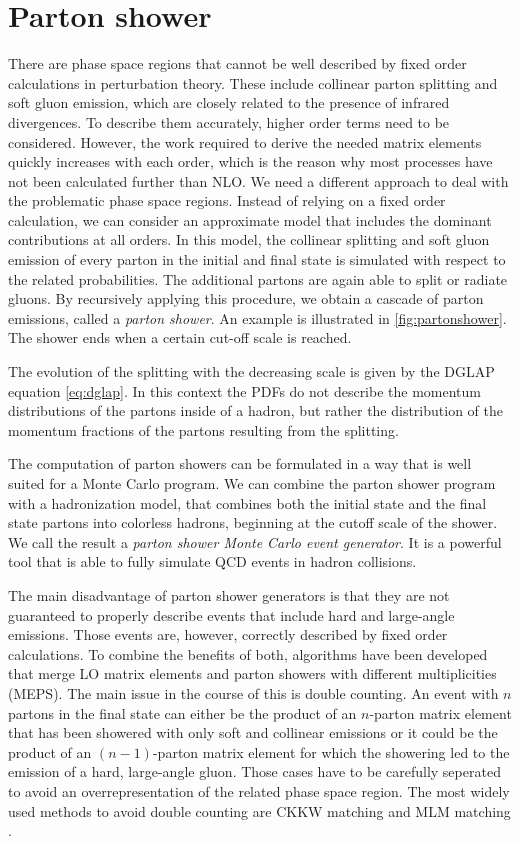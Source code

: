 \section{Parton shower}
There are phase space regions that cannot be well described by fixed order calculations in perturbation theory.
These include collinear parton splitting and soft gluon emission, which are closely related to the presence of infrared divergences.
To describe them accurately, higher order terms need to be considered.
However, the work required to derive the needed matrix elements quickly increases with each order, which is the reason why most processes have not been calculated further than NLO.
We need a different approach to deal with the problematic phase space regions.
Instead of relying on a fixed order calculation, we can consider an approximate model that includes the dominant contributions at all orders.
In this model, the collinear splitting and soft gluon emission of every parton in the initial and final state is simulated with respect to the related probabilities.
The additional partons are again able to split or radiate gluons.
By recursively applying this procedure, we obtain a cascade of parton emissions, called a \textit{parton shower}.
An example is illustrated in \cref{fig:partonshower}.
The shower ends when a certain cut-off scale is reached.

The evolution of the splitting with the decreasing scale is given by the DGLAP equation \cref{eq:dglap}.
In this context the PDFs do not describe the momentum distributions of the partons inside of a hadron, but rather the distribution of the momentum fractions of the partons resulting from the splitting.

The computation of parton showers can be formulated in a way that is well suited for a Monte Carlo program.
We can combine the parton shower program with a hadronization model, that combines both the initial state and the final state partons into colorless hadrons, beginning at the cutoff scale of the shower. We call the result a \textit{parton shower Monte Carlo event generator}.
It is a powerful tool that is able to fully simulate QCD events in hadron collisions.

The main disadvantage of parton shower generators is that they are not guaranteed to properly describe events that include hard and large-angle emissions.
Those events are, however, correctly described by fixed order calculations.
To combine the benefits of both, algorithms have been developed that merge LO matrix elements and parton showers with different multiplicities (MEPS).
The main issue in the course of this is double counting.
An event with $n$ partons in the final state can either be the product of an $n$-parton matrix element that has been showered with only soft and collinear emissions or it could be the product of an $(n-1)$-parton matrix element for which the showering led to the emission of a hard, large-angle gluon.
Those cases have to be carefully seperated to avoid an overrepresentation of the related phase space region.
The most widely used methods to avoid double counting are CKKW matching \cite{ckkw_a,ckkw_b} and MLM matching \cite{mlm_a,mlm_b}.

